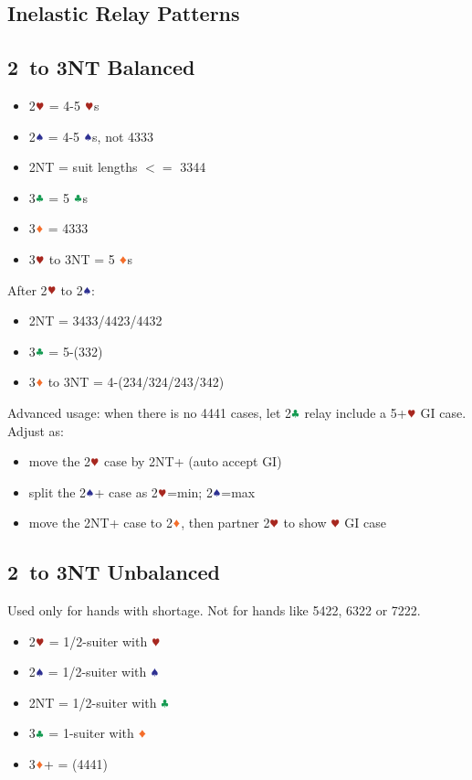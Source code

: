 \documentclass{article}
\begin{document}
\begin{multicols}{2}
\begin{CJK*}{UTF8}{gt}
\section{Inelastic Relay Patterns}

\subsection{2\HHH\ to 3NT Balanced}
\label{sec:2h-3nt-bal}

\begin{itemize}
    \item 2$\hhh$ = 4-5 $\hhh$s
    \item 2$\sss$ = 4-5 $\sss$s, not 4333
    \item 2NT = suit lengths $<=$ 3344
    \item 3$\ccc$ = 5 $\ccc$s
    \item 3$\ddd$ = 4333
    \item 3$\hhh$ to 3NT = 5 $\ddd$s
\end{itemize}

\noindent After 2$\hhh$ to 2$\sss$:
\begin{itemize}
    \item 2NT = 3433/4423/4432
    \item 3$\ccc$ = 5-(332)
    \item 3$\ddd$ to 3NT = 4-(234/324/243/342)
\end{itemize}

\noindent Advanced usage: when there is no 4441 cases, let 2$\ccc$ relay include a 5+$\hhh$ GI case. Adjust as:
\begin{itemize}
    \item move the 2$\hhh$ case by 2NT+ (auto accept GI)
    \item split the 2$\sss$+ case as 2$\hhh$=min; 2$\sss$=max
    \item move the 2NT+ case to 2$\ddd$, then partner 2$\hhh$ to show $\hhh$ GI case
\end{itemize}

\subsection{2\HHH\ to 3NT Unbalanced}
\label{sec:2h-3nt-unbal}
Used only for hands with shortage. Not for hands like 5422, 6322 or 7222.

\begin{itemize}
    \item 2$\hhh$ = 1/2-suiter with $\hhh$
    \item 2$\sss$ = 1/2-suiter with $\sss$
    \item 2NT = 1/2-suiter with $\ccc$
    \item 3$\ccc$ = 1-suiter with $\ddd$
    \item 3$\ddd$+ = (4441)
\end{itemize}


\end{CJK*}
\end{multicols}
\end{document}
